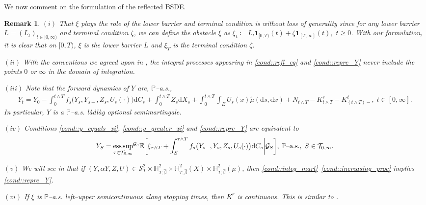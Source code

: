 \documentclass[10pt]{article} %
\newtheorem{remark}[theorem]{Remark}
\newcommand\cG{\mathcal G}
\newcommand\cS{\mathcal S}
\newcommand\cT{\mathcal T}
\newcommand{\smalltext}[1]{\text{\fontsize{4}{4}\selectfont$#1$}}
\def \E{\mathbb{E}}
\def \H{\mathbb{H}}
\def \P{\mathbb{P}}
\newcommand{\1}{\mathbf{1}}
\def\d{\mathrm{d}}
\DeclareMathOperator*{\esssup}{ess\,sup}
\begin{document}
We now comment on the formulation of the reflected BSDE. 
\begin{remark}\label{rem::after_formulation}
	$(i)$ That $\xi$ plays the role of the lower barrier and terminal condition is without loss of generality since for any lower barrier $L = (L_t)_{t \in [0,\infty)}$ and terminal condition $\zeta$, we can define the obstacle $\xi$ as $\xi_t \coloneqq L_t \mathbf{1}_{[0,T)}(t) + \zeta \mathbf{1}_{[T,\infty]}(t),$ $t\geq 0$. With our formulation, it is clear that on $[0,T)$, $\xi$ is the lower barrier $L$ and $\xi_T$ is the terminal condition $\zeta$.
	
	\medskip
	$(ii)$ With the conventions we agreed upon in {\rm{}}, the integral processes appearing in \ref{cond::refl_eq} and \ref{cond::repre_Y} never include the points $0$ or $\infty$ in the domain of integration.
	
	\medskip
	$(iii)$ Note that the forward dynamics of $Y$ are, $\P${\rm--a.s.},
	\begin{align*}
			Y_t = Y_0 - \int_0^{t \land T} f_s\big(Y_s,Y_{s-},Z_s,U_s(\cdot)\big) \d C_s  + \int_0^{t \land T} Z_s \d X_s + \int_0^{t \wedge T} \int_E U_s(x)\tilde\mu(\d s, \d x) + N_{t \land T} - K^r_{t \land T} - K^{\ell}_{(t \land T)-}, \; t \in [0,\infty].
		\end{align*}
	In particular, $Y$ is a $\P${\rm--a.s.} l\`adl\`ag optional semimartingale.
	
	\medskip
	$(iv)$ Conditions \ref{cond::y_equals_xi}, \ref{cond::y_greater_xi} and \ref{cond::repre_Y} are equivalent to
	\begin{equation*}
		Y_S = {\esssup_{\tau \in \cT_{S,\infty}}}^{\cG_\smalltext{S}} \E \bigg[  \xi_{\tau \land T} + \int_S^{\tau \land T} f_s\big(Y_{s-},Y_s, Z_s, U_s(\cdot)\big) \d C_s \bigg| \cG_S \bigg], \; \text{$\P$\rm--a.s.}, \; S \in \cT_{0,\infty}.
	\end{equation*}
	
	\medskip
	$(v)$ We will see in {\rm{}} that if $(Y,\alpha Y,Z,U) \in \cS^2_T \times \H^2_{T,\hat\beta} \times \H^2_{T,\hat\beta}(X) \times \H^2_{T,\hat\beta}(\mu)$, then \ref{cond::integ_mart}--\ref{cond::increasing_proc} implies \ref{cond::repre_Y}.
	
	\medskip
	$(vi)$ If $\xi$ is {\rm$\P$--a.s.} left--upper semicontinuous along stopping times, then $K^r$ is continuous. This is similar to {\rm\cite[Remark 2.4]{grigorova2020optimal}}.


\end{remark}
\end{document}
